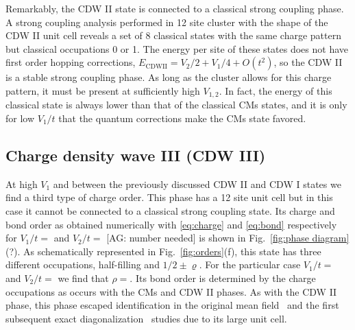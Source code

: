 \documentclass[aps,prx,10pt,twocolumn,floatfix,superscriptaddress,showpacs,numerical,footinbib]{revtex4-1}
\newcommand{\noteAG}[1]{{\color{blue} [AG: #1]}}
\begin{document}
%
Remarkably, the CDW II state is connected to a classical strong coupling phase.
%
A strong coupling analysis performed in 12 site cluster with the shape of the CDW II 
unit cell reveals a set of 8 classical states with the same charge pattern but classical occupations 0 or 1. 
%
The energy per site of these states does not have first order hopping corrections,
$E_{\mathrm{CDW II}} = V_2/2+V_1/4 + O(t^2)$, so the CDW II is a stable strong coupling phase. 
%
As long as the cluster allows for this charge pattern, it must be present at sufficiently high $V_{1,2}$.
%
In fact, the energy of this classical state is always lower than that of the classical CMs states, 
and it is only for low $V_1/t$ that the quantum corrections make the CMs state favored. 
%

\subsection{Charge density wave III (CDW III)}
%
At high $V_{1}$ and between the previously discussed CDW II and CDW I states
we find a third type of charge order.
%
This phase has a 12 site unit cell but in this case it cannot be connected to a classical strong coupling state.
%
Its charge and bond order as obtained numerically with \eqref{eq:charge} and \eqref{eq:bond} respectively
for $V_{1}/t=$ and $V_{2}/t=$\noteAG{number needed} is shown in Fig.~\ref{fig:phase diagram}(?).
%
As schematically represented in Fig.~\ref{fig:orders}(f), this state has three 
different occupations, half-filling and $1/2\pm\varrho$.
%
For the particular case $V_{1}/t=$ and $V_{2}/t=$ we find that $\rho=$.
%
Its bond order is determined by the charge occupations 
as occurs with the CMs and CDW II phases.
%
As with the CDW II phase, this phase escaped
identification in the original mean field~\cite{RQHZ08,WF10,GCC13} 
and the first subsequent exact diagonalization~\cite{GGNVC13,DH14,DCH14} studies 
due to its large unit cell.
%
 
\end{document}

